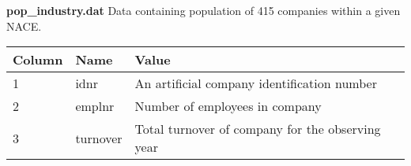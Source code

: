 \documentclass[12pt]{article}
\begin{document}
\noindent\textbf{pop\_industry.dat} Data containing population of 415 companies within a given NACE.
\begin{center}
\begin{tabular}{l|ll}
Column & Name & Value \\
\hline
1& idnr & An artificial company identification number\\
2& emplnr & Number of employees in company\\
3& turnover & Total turnover of company for the observing year\\
\end{tabular}
\end{center}
\end{document}

